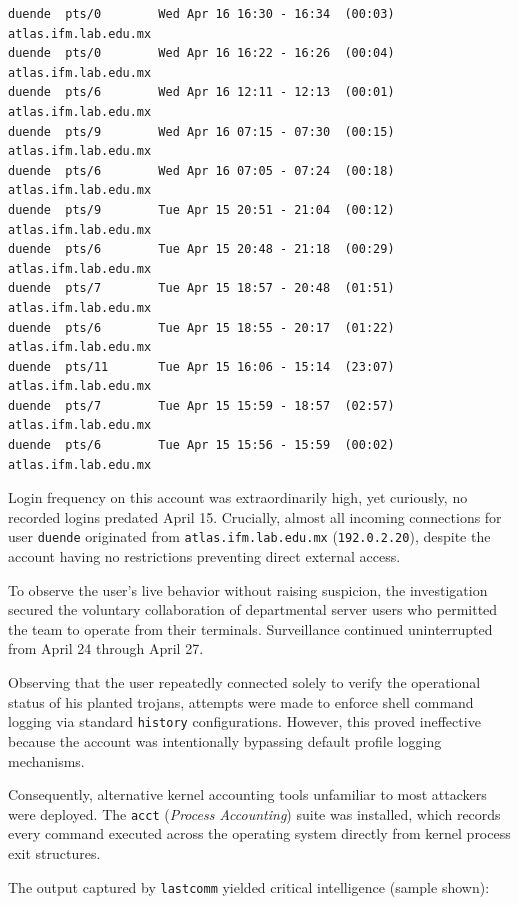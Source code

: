 \begin{lstlisting}[style=terminal]
duende  pts/0        Wed Apr 16 16:30 - 16:34  (00:03)     atlas.ifm.lab.edu.mx
duende  pts/0        Wed Apr 16 16:22 - 16:26  (00:04)     atlas.ifm.lab.edu.mx
duende  pts/6        Wed Apr 16 12:11 - 12:13  (00:01)     atlas.ifm.lab.edu.mx
duende  pts/9        Wed Apr 16 07:15 - 07:30  (00:15)     atlas.ifm.lab.edu.mx
duende  pts/6        Wed Apr 16 07:05 - 07:24  (00:18)     atlas.ifm.lab.edu.mx
duende  pts/9        Tue Apr 15 20:51 - 21:04  (00:12)     atlas.ifm.lab.edu.mx
duende  pts/6        Tue Apr 15 20:48 - 21:18  (00:29)     atlas.ifm.lab.edu.mx
duende  pts/7        Tue Apr 15 18:57 - 20:48  (01:51)     atlas.ifm.lab.edu.mx
duende  pts/6        Tue Apr 15 18:55 - 20:17  (01:22)     atlas.ifm.lab.edu.mx
duende  pts/11       Tue Apr 15 16:06 - 15:14  (23:07)     atlas.ifm.lab.edu.mx
duende  pts/7        Tue Apr 15 15:59 - 18:57  (02:57)     atlas.ifm.lab.edu.mx
duende  pts/6        Tue Apr 15 15:56 - 15:59  (00:02)     atlas.ifm.lab.edu.mx
\end{lstlisting}

\vspace{1em}

Login frequency on this account was extraordinarily high, yet curiously, no recorded logins predated April 15. Crucially, almost all incoming connections for user \texttt{duende} originated from \nolinkurl{atlas.ifm.lab.edu.mx} (\texttt{192.0.2.20}), despite the account having no restrictions preventing direct external access.

To observe the user's live behavior without raising suspicion, the investigation secured the voluntary collaboration of departmental server users who permitted the team to operate from their terminals. Surveillance continued uninterrupted from April 24 through April 27.

Observing that the user repeatedly connected solely to verify the operational status of his planted trojans, attempts were made to enforce shell command logging via standard \texttt{history} configurations. However, this proved ineffective because the account was intentionally bypassing default profile logging mechanisms.

Consequently, alternative kernel accounting tools unfamiliar to most attackers were deployed. The \texttt{acct} (\textit{Process Accounting}) suite was installed, which records every command executed across the operating system directly from kernel process exit structures.

The output captured by \texttt{lastcomm} yielded critical intelligence (sample shown):

